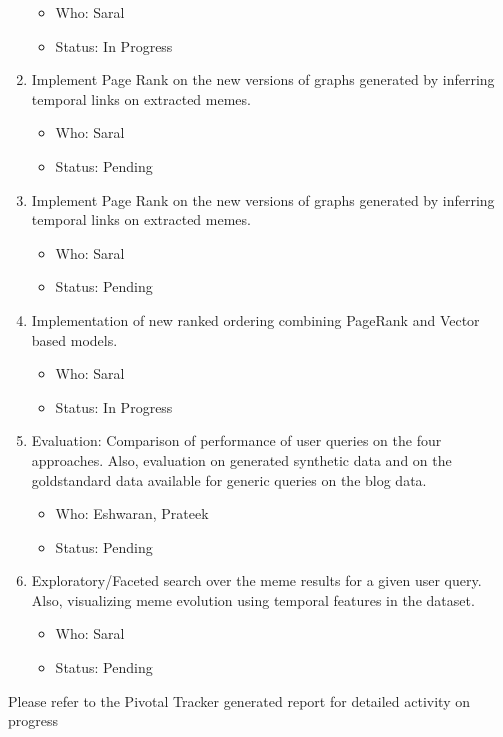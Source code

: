 \documentclass{acm_proc_article-sp}
\begin{document}
\begin{enumerate}
\begin{itemize}
	\item Who: Saral
	\item Status: In Progress
	\end{itemize}	
  \item Implement Page Rank on the new versions of graphs generated by inferring temporal links on extracted memes. \begin{itemize}
	\item Who: Saral
	\item Status: Pending
	\end{itemize}
  \item Implement Page Rank on the new versions of graphs generated by inferring temporal links on extracted memes. \begin{itemize}
	\item Who: Saral
	\item Status: Pending
	\end{itemize}
  \item Implementation of new ranked ordering combining PageRank and Vector based models. \begin{itemize}
	\item Who: Saral
	\item Status: In Progress
	\end{itemize}
  \item Evaluation: Comparison of performance of user queries on the four approaches. Also, evaluation on generated synthetic data and on the goldstandard data available for generic queries on the blog data. \begin{itemize}
	\item Who: Eshwaran, Prateek
	\item Status: Pending
	\end{itemize}
  \item Exploratory/Faceted search over the meme results for a given user query. Also, visualizing meme evolution using temporal features in the dataset. \begin{itemize}
	\item Who: Saral
	\item Status: Pending
	\end{itemize}
\end{enumerate}

Please refer to the Pivotal Tracker generated report for detailed activity on progress




%


%
%
\end{document}
